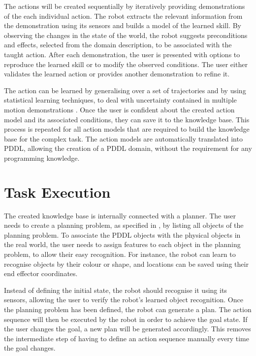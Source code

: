 The actions will be created sequentially by iteratively providing demonstrations of the each individual action.
The robot extracts the relevant information from the demonstration using its sensors and builds a model of the learned skill.
By observing the changes in the state of the world, the robot suggests preconditions and effects, selected from the domain description, to be associated with the taught action.
After each demonstration, the user is presented with options to reproduce the learned skill or to modify the observed conditions.
The user either validates the learned action or provides another demonstration to refine it.
 

The action can be learned by generalising over a set of trajectories and by using statistical learning techniques, to deal with uncertainty contained in multiple motion demonstrations \cite{ude1993trajectory}.
Once the user is confident about the created action model and its associated conditions, they can save it to the knowledge base.
 This process is repeated for all action models that are required to build the knowledge base for the complex task.
 The action models are automatically translated into PDDL, allowing the creation of a PDDL domain, without the requirement for any programming knowledge.

\section{Task Execution}
The created knowledge base is internally connected with a planner.
 The user needs to create a planning problem, as specified in , by listing all objects of the planning problem.
 To associate the PDDL objects with the physical objects in the real world, the user needs to assign features to each object in the planning problem, to allow their easy recognition.
 For instance, the robot can learn to recognise objects by their colour or shape, and locations can be saved using their end effector coordinates.

Instead of defining the initial state, the robot should recognise it using its sensors, allowing the user to verify the robot's learned object recognition.
 Once the planning problem has been defined, the robot can generate a plan.
 The action sequence will then be executed by the robot in order to achieve the goal state.
 If the user changes the goal, a new plan will be generated accordingly.
This removes the intermediate step of having to define an action sequence manually every time the goal changes.
 
